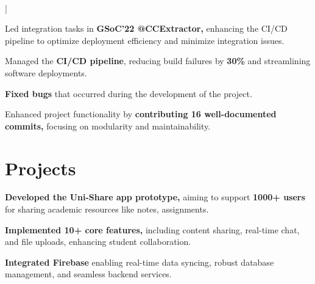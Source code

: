 \documentclass[]{deedy-resume-openfont}
\begin{document}
\vspace{0.4mm} 
\hfill {} \\
\vspace{0.7mm} 
\hfill {} | 
\vspace{1.7mm}
\begin{tightemize}
	\item Led integration tasks in \textbf{GSoC'22 @CCExtractor,} enhancing the CI/CD pipeline to optimize deployment efficiency and minimize integration issues.
	\vspace{-1mm}
	\item Managed the \textbf{CI/CD pipeline}, reducing build failures by \textbf{30\%} and streamlining software deployments.
	\vspace{-1mm}
	\item \textbf{Fixed bugs} that occurred during the development of the project.
	\vspace{-1mm}
	\item Enhanced project functionality by \textbf{contributing 16 well-documented commits,} focusing on modularity and maintainability.
\end{tightemize}
\sectionsep



\section{Projects}
\hfill {}
\vspace{1.7mm}
\begin{tightemize}
	\item \textbf{Developed the Uni-Share app prototype,} aiming to support \textbf{1000+ users} for sharing academic resources like notes, assignments.
    \vspace{-1.7mm}
	\item \textbf{Implemented 10+ core features,} including content sharing, real-time chat, and file uploads, enhancing student collaboration.
    \vspace{-1.7mm}
    \item \textbf{Integrated Firebase} enabling real-time data syncing, robust database management, and seamless backend services.
\end{tightemize}
\sectionsep
\end{document}
